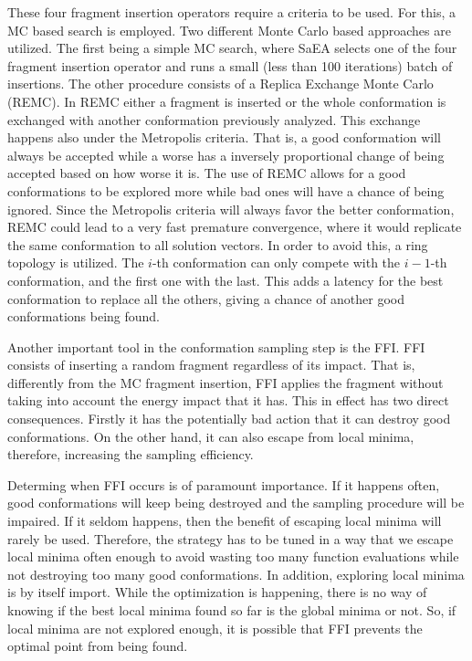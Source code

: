 These four fragment insertion operators require a criteria to be used. For
this, a \ac{MC} based search is employed. Two different Monte Carlo based
approaches are utilized. The first being a simple \ac{MC} search, where
\ac{SaEA} selects one of the four fragment insertion operator and runs a small
(less than 100 iterations) batch of insertions. The other procedure consists of
a Replica Exchange Monte Carlo (REMC). In \ac{REMC} either a fragment is
inserted or the whole conformation is exchanged with another conformation
previously analyzed. This exchange happens also under the Metropolis criteria.
That is, a good conformation will always be accepted while a worse has a
inversely proportional change of being accepted based on how worse it is.  The
use of \ac{REMC} allows for a good conformations to be explored more while bad
ones will have a chance of being ignored. Since the Metropolis criteria will
always favor the better conformation, \ac{REMC} could lead to a very fast
premature convergence, where it would replicate the same conformation to all
solution vectors.  In order to avoid this, a ring topology is utilized. The
$i$-th conformation can only compete with the $i-1$-th conformation, and the
first one with the last. This adds a latency for the best conformation to
replace all the others, giving a chance of another good conformations being
found.

Another important tool in the conformation sampling step is the \ac{FFI}.
\ac{FFI} consists of inserting a random fragment regardless of its impact. That is,
differently from the \ac{MC} fragment insertion, \ac{FFI} applies the fragment
without taking into account the energy impact that it has. This in effect has
two direct consequences. Firstly it has the potentially bad action that it can
destroy good conformations. On the other hand, it can also escape from local
minima, therefore, increasing the sampling efficiency.

Determing when \ac{FFI}
occurs is of paramount importance. If it happens often, good conformations will
keep being destroyed and the sampling procedure will be impaired. If it seldom 
happens, then the benefit of escaping local minima will rarely be used. Therefore,
the strategy has to be tuned in a way that we escape local minima often enough
to avoid wasting too many function evaluations while not destroying too many
good conformations. In addition, exploring local minima is by itself import.
While the optimization is happening, there is no way of knowing if the best local
minima found so far is the global minima or not. So, if local minima are not
explored enough, it is possible that \ac{FFI} prevents the optimal point from
being found.

